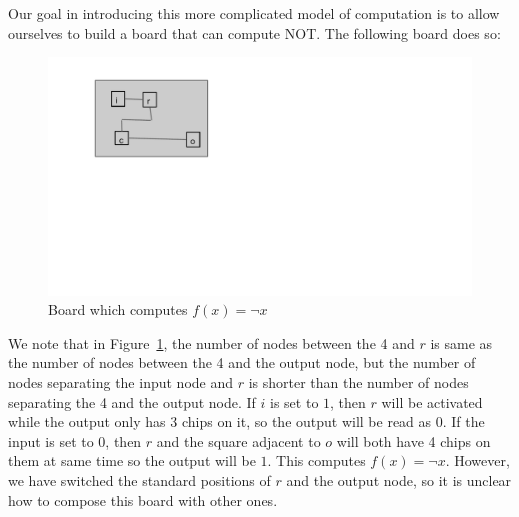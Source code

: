 \documentclass[runningheads,a4paper]{llncs}
\begin{document}







Our goal in introducing this more complicated model of computation is to allow ourselves to build a board that can compute NOT. The following board does so:
\begin{figure}
\centering
\includegraphics[width=0.5\linewidth]{notgate}
\caption{Board which computes $f(x) = \neg x$}
\label{fig:NOT}
\end{figure}
We note that in Figure~\ref{fig:NOT}, the number of nodes between the 4 and $r$ is same as the number of nodes between the 4 and the output node, but the number of nodes separating the input node and $r$ is shorter than the number of nodes separating the 4 and the output node. If $i$ is set to $1$, then $r$ will be activated while the output only has 3 chips on it, so the output will be read as 0. If the input is set to 0, then $r$ and the square adjacent to $o$ will both have 4 chips on them at same time so the output will be $1$. This computes $f(x) = \neg x$. However, we have switched the standard positions of $r$ and the output node, so it is unclear how to compose this board with other ones. 
\end{document}
